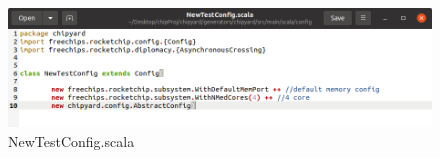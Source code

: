 \documentclass{article}
\begin{document}
	
	
\begin{figure}[H]
	\centering
	\includegraphics[width=0.7\linewidth]{NewTestConfig}
	\caption[]{NewTestConfig.scala}
	\label{fig:newtestconfig}
\end{figure}
	
\end{document}
